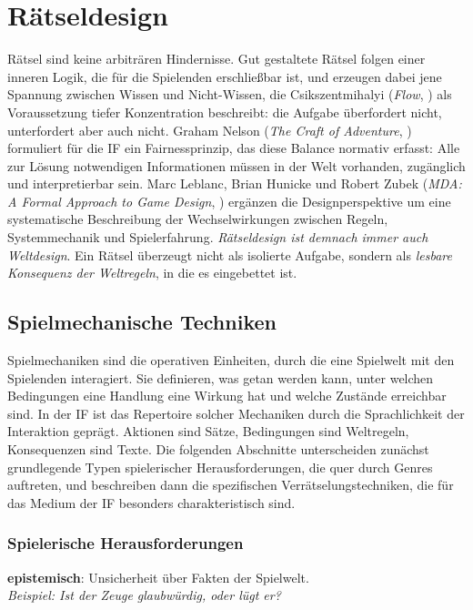 \documentclass[parskip=half,a4paper,11pt]{scrreprt}
\begin{document}
\section{Rätseldesign}

Rätsel sind keine arbiträren Hindernisse. Gut gestaltete Rätsel folgen einer inneren Logik, die für die Spielenden erschließbar ist, und erzeugen dabei jene Spannung zwischen Wissen und Nicht-Wissen, die Csikszentmihalyi (\textit{Flow}, \citep{Csikszentmihalyi1990}) als Voraussetzung tiefer Konzentration beschreibt: die Aufgabe überfordert nicht, unterfordert aber auch nicht. Graham Nelson (\textit{The Craft of Adventure}, \citep{Nelson1994}) formuliert für die IF ein Fairnessprinzip, das diese Balance normativ erfasst: Alle zur Lösung notwendigen Informationen müssen in der Welt vorhanden, zugänglich und interpretierbar sein. Marc Leblanc, Brian Hunicke und Robert Zubek (\textit{MDA: A Formal Approach to Game Design}, \citep{Hunicke2004}) ergänzen die Designperspektive um eine systematische Beschreibung der Wechselwirkungen zwischen Regeln, Systemmechanik und Spielerfahrung.\textit{ Rätseldesign ist demnach immer auch Weltdesign}. Ein Rätsel überzeugt nicht als isolierte Aufgabe, sondern als \textit{lesbare Konsequenz der Weltregeln}, in die es eingebettet ist.

\subsection{Spielmechanische Techniken}

Spielmechaniken sind die operativen Einheiten, durch die eine Spielwelt mit den Spielenden interagiert. Sie definieren, was getan werden kann, unter welchen Bedingungen eine Handlung eine Wirkung hat und welche Zustände erreichbar sind. In der IF ist das Repertoire solcher Mechaniken durch die Sprachlichkeit der Interaktion geprägt. Aktionen sind Sätze, Bedingungen sind Weltregeln, Konsequenzen sind Texte. Die folgenden Abschnitte unterscheiden zunächst grundlegende Typen spielerischer Herausforderungen, die quer durch Genres auftreten, und beschreiben dann die spezifischen Verrätselungstechniken, die für das Medium der IF besonders charakteristisch sind.

\subsubsection{Spielerische Herausforderungen}

\textbf{epistemisch}: Unsicherheit über Fakten der Spielwelt.  \\
\textit{Beispiel: Ist der Zeuge glaubwürdig, oder lügt er?}
\end{document}
